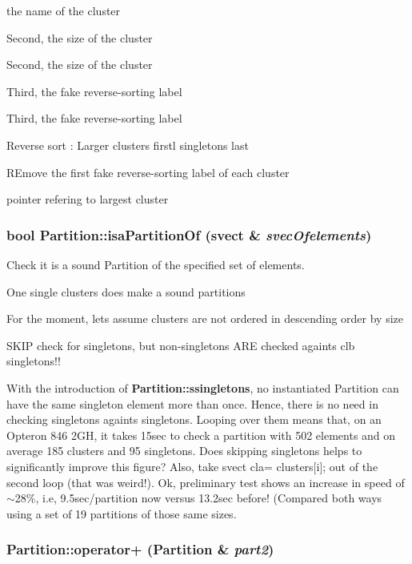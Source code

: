 the name of the cluster

Second, the size of the cluster

Second, the size of the cluster

Third, the fake reverse-sorting label

Third, the fake reverse-sorting label

Reverse sort : Larger clusters firstl singletons last

REmove the first fake reverse-sorting label of each cluster

pointer refering to largest cluster 
\subsubsection{\setlength{\rightskip}{0pt plus 5cm}bool Partition::isa\-Partition\-Of (svect \& {\em svec\-Ofelements})}\label{classPartition_a9}


Check it is a sound Partition of the specified set of elements. 

One single clusters does make a sound partitions

For the moment, lets assume clusters are not ordered in descending order by size

SKIP check for singletons, but non-singletons ARE checked againts clb singletons!!

With the introduction of {\bf Partition::ssingletons}, no instantiated Partition can have the same singleton element more than once. Hence, there is no need in checking singletons againts singletons. Looping over them means that, on an Opteron 846 2GH, it takes 15sec to check a partition with 502 elements and on average 185 clusters and 95 singletons. Does skipping singletons helps to significantly improve this figure? Also, take svect cla= clusters[i]; out of the second loop (that was weird!). Ok, preliminary test shows an increase in speed of $\sim$28\%, i.e, 9.5sec/partition now versus 13.2sec before! (Compared both ways using a set of 19 partitions of those same sizes. 
\subsubsection{ Partition::operator+ ({\bf Partition} \& {\em part2})}\label{classPartition_a62}


